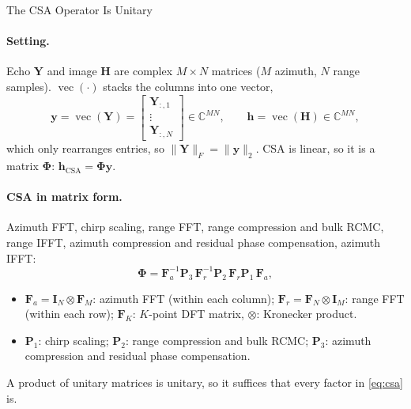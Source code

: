 \documentclass[11pt,a4paper]{article}
\newcommand{\bPhi}{\boldsymbol\Phi}
\newcommand{\y}{\mathbf y}
\newcommand{\h}{\mathbf h}
\DeclareMathOperator{\vect}{vec}
\begin{document}
\begin{center}
{\LARGE The CSA Operator Is Unitary}
\end{center}

\paragraph{Setting.} Echo $\mathbf Y$ and image $\mathbf H$ are complex $M\times N$ matrices ($M$ azimuth, $N$ range samples).
$\vect(\cdot)$ stacks the columns into one vector,
\begin{equation}
  \y = \vect(\mathbf Y) = \begin{bmatrix} \mathbf Y_{:,1} \\ \vdots \\ \mathbf Y_{:,N} \end{bmatrix} \in \mathbb C^{MN},
  \qquad \h = \vect(\mathbf H) \in \mathbb C^{MN},
\end{equation}
which only rearranges entries, so $\lVert \mathbf Y \rVert_F = \lVert \y \rVert_2$.
CSA \cite{cumming2005} is linear, so it is a matrix $\bPhi$: $\h_{\mathrm{CSA}} = \bPhi\y$.

\paragraph{CSA in matrix form.} Azimuth FFT, chirp scaling, range FFT, range compression and bulk RCMC, range IFFT,
azimuth compression and residual phase compensation, azimuth IFFT:
\begin{equation}\label{eq:csa}
  \bPhi = \mathbf F_a^{-1}\mathbf P_3\,\mathbf F_r^{-1}\mathbf P_2\,\mathbf F_r\mathbf P_1\,\mathbf F_a,
\end{equation}
\begin{itemize}
  \item $\mathbf F_a = \mathbf I_N \otimes \mathbf F_M$: azimuth FFT (within each column);
        $\mathbf F_r = \mathbf F_N \otimes \mathbf I_M$: range FFT (within each row);
        $\mathbf F_K$: $K$-point DFT matrix, $\otimes$: Kronecker product.
  \item $\mathbf P_1$: chirp scaling; $\mathbf P_2$: range compression and bulk RCMC;
        $\mathbf P_3$: azimuth compression and residual phase compensation.
\end{itemize}
A product of unitary matrices is unitary, so it suffices that every factor in \eqref{eq:csa} is.
\end{document}
